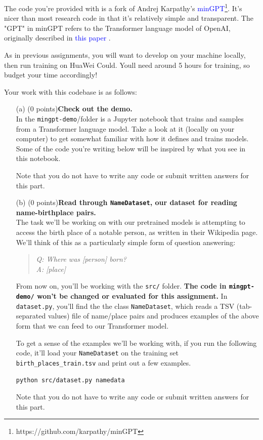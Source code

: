 \documentclass[letterpaper,12pt]{article}
\begin{document}
	\noindent The code you're provided with is a fork of Andrej Karpathy's \textcolor{blue}{minGPT\footnote{https://github.com/karpathy/minGPT}}. It's nicer than most research code in that it's relatively simple and transparent. The "GPT" in minGPT refers to the Transformer language model of OpenAI, originally described in \textcolor{blue}{this paper} \cite{b1}.
	
	\noindent As in previous assignments, you will want to develop on your machine locally, then run training on HuaWei Could. Youll need around 5 hours for training, so budget your time accordingly!

	\noindent Your work with this codebase is as follows:
	
	\begin{itemize}
	\item[(a)]
		(0 points)\textbf{Check out the demo.}\\
		In  the \texttt{mingpt-demo}/folder is a Jupyter notebook that trains and samples from a Transformer language model. Take a look at it (locally on your computer) to get somewhat familiar with how it defines and trains models. Some of the code you're writing below will be inspired by what you see in this notebook.
		
		Note that you do not have to write any code or submit written answers for this part.
		
	\item[(b)]
		(0 points)\textbf{Read through \texttt{NameDataset}, our dataset for reading name-birthplace pairs.}\\
		The task we'll be working on with our pretrained models is attempting to access the birth place of a notable person, as written in their Wikipedia page.
		We'll think of this as a particularly simple form of question answering:
		\begin{quote}
			\textit{Q: Where was \textit{[person]} born?}\\
			\textit{A: [place]}
		\end{quote}
		From now on, you'll be working with the \texttt{src/} folder. \textbf{The code in \texttt{mingpt-demo/} won't be changed or evaluated for this assignment.}
		In \texttt{dataset.py}, 
		you'll find the the class \texttt{NameDataset}, which reads a TSV (tab-separated values) file of name/place pairs and produces examples of the above form that we can feed to our Transformer model.
		
		To get a sense of the examples we'll be working with, if you run the following code, it'll load your \texttt{NameDataset} on the training set \texttt{birth\_places\_train.tsv} and print out a few examples.
		\begin{lstlisting}[language=bash]
			python src/dataset.py namedata 
		\end{lstlisting}
		Note that you do not have to write any code or submit written answers for this part.
		

\end{itemize}
\end{document}
